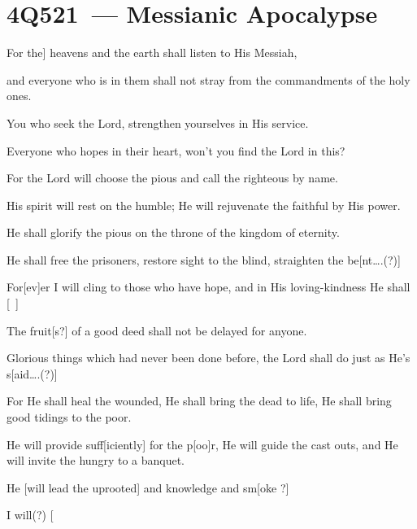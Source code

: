 \section{4Q521~--- Messianic Apocalypse}\label{dss:4q521}

\begin{inparaenum}
  {\noindent{} For the] heavens and the earth shall listen to His Messiah,}%
  
  {\noindent{} and everyone who is in them shall not stray from the commandments of the holy ones.}%
  
  {\noindent{} You who seek the Lord, strengthen yourselves in His service.}%
  
  {\noindent{} Everyone who hopes in their heart, won't you find the Lord in this?}%
  
  {\noindent{} For the Lord will choose the pious and call the righteous by name.}%
  
  {\noindent{} His spirit will rest on the humble; He will rejuvenate the faithful by His power.}%
  
  {\noindent{} He shall glorify the pious on the throne of the kingdom of eternity.}%
  
  {\noindent{} He shall free the prisoners, restore sight to the blind, straighten the be[nt\dots.(?)]}%
  
  {\noindent{} For[ev]er I will cling to those who have hope, and in His loving-kindness He shall [\ ]}%
  
  {\noindent{} The fruit[s?] of a good deed shall not be delayed for anyone.}%
  
  {\noindent{} Glorious things which had never been done before, the Lord shall do just as He's s[aid\dots.(?)]}%
  
  {\noindent{} For He shall heal the wounded, He shall bring the dead to life, He shall bring good tidings to the poor.}%
  
  {\noindent{} He will provide suff[iciently] for the p[oo]r, He will guide the cast outs, and He will invite the hungry to a banquet.}%
  
  {\noindent{} He [will lead the uprooted] and knowledge and sm[oke ?]}%
  
  {\noindent{} I will(?) [}%
\end{inparaenum}
